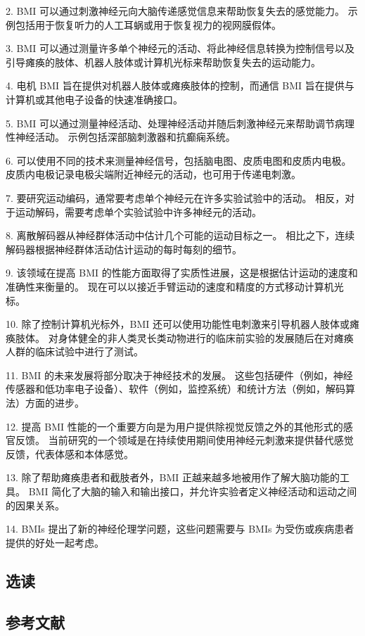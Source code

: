 2. BMI 可以通过刺激神经元向大脑传递感觉信息来帮助恢复失去的感觉能力。 示例包括用于恢复听力的人工耳蜗或用于恢复视力的视网膜假体。 

3. BMI 可以通过测量许多单个神经元的活动、将此神经信息转换为控制信号以及引导瘫痪的肢体、机器人肢体或计算机光标来帮助恢复失去的运动能力。 

4. 电机 BMI 旨在提供对机器人肢体或瘫痪肢体的控制，而通信 BMI 旨在提供与计算机或其他电子设备的快速准确接口。

5. BMI 可以通过测量神经活动、处理神经活动并随后刺激神经元来帮助调节病理性神经活动。 示例包括深部脑刺激器和抗癫痫系统。 

6. 可以使用不同的技术来测量神经信号，包括脑电图、皮质电图和皮质内电极。 皮质内电极记录电极尖端附近神经元的活动，也可用于传递电刺激。 

7. 要研究运动编码，通常要考虑单个神经元在许多实验试验中的活动。 相反，对于运动解码，需要考虑单个实验试验中许多神经元的活动。 

8. 离散解码器从神经群体活动中估计几个可能的运动目标之一。 相比之下，连续解码器根据神经群体活动估计运动的每时每刻的细节。 

9. 该领域在提高 BMI 的性能方面取得了实质性进展，这是根据估计运动的速度和准确性来衡量的。 现在可以以接近手臂运动的速度和精度的方式移动计算机光标。 

10. 除了控制计算机光标外，BMI 还可以使用功能性电刺激来引导机器人肢体或瘫痪肢体。 对身体健全的非人类灵长类动物进行的临床前实验的发展随后在对瘫痪人群的临床试验中进行了测试。 

11. BMI 的未来发展将部分取决于神经技术的发展。 这些包括硬件（例如，神经传感器和低功率电子设备）、软件（例如，监控系统）和统计方法（例如，解码算法）方面的进步。 

12. 提高 BMI 性能的一个重要方向是为用户提供除视觉反馈之外的其他形式的感官反馈。 当前研究的一个领域是在持续使用期间使用神经元刺激来提供替代感觉反馈，代表体感和本体感觉。 

13. 除了帮助瘫痪患者和截肢者外，BMI 正越来越多地被用作了解大脑功能的工具。 BMI 简化了大脑的输入和输出接口，并允许实验者定义神经活动和运动之间的因果关系。 

14. BMIs 提出了新的神经伦理学问题，这些问题需要与 BMIs 为受伤或疾病患者提供的好处一起考虑。

\subsection{选读}
\subsection{参考文献}

